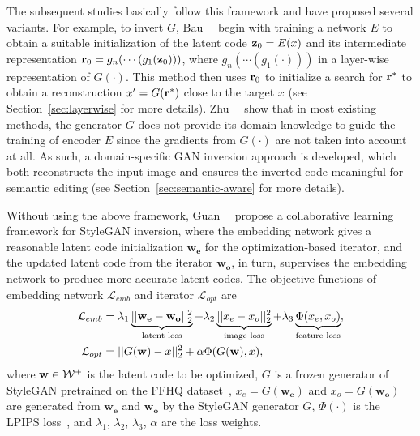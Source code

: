 The subsequent studies basically follow this framework and have proposed several variants.
For example, to invert $G$, Bau~\etal~\cite{bau2019inverting} begin with training a network $E$ to obtain a suitable initialization of the latent code $\mathbf{z}_{0}=E(x)$ and its intermediate representation $\mathbf{r}_{0}=g_{n}(\cdots(g_{1}(\mathbf{z}_{0})))$, where $g_{n}(\cdots(g_{1}(\cdot)))$ in a layer-wise representation of $G(\cdot)$.
This method then uses $\mathbf{r}_{0}$ to initialize a search for $\mathbf{r}^{*}$ to obtain a reconstruction $x^{\prime}=G(\mathbf{r}^{*})$ close to the target $x$ 
(see Section~\ref{sec:layerwise} for more details).
Zhu~\etal~\cite{zhu2020indomain} show that in most existing methods, the generator $G$ does not provide its domain knowledge to guide the training of encoder $E$ since the gradients from $G(\cdot)$ are not taken into account at all. 
As such, a domain-specific GAN inversion approach is developed, which both reconstructs the input image and ensures the inverted code meaningful for semantic editing 
(see Section~\ref{sec:semantic-aware} for more details).

Without using the above framework, Guan~\etal~\cite{guan2020faster} propose a collaborative learning framework for StyleGAN inversion, where the embedding network gives a reasonable latent code initialization $\mathbf{w_e}$ for the optimization-based iterator, and the updated latent code from the iterator $\mathbf{w_o}$, in turn, supervises the embedding network to produce more accurate latent codes. The objective functions of embedding network $\mathcal{L}_{emb}$ and iterator $\mathcal{L}_{opt}$ are 
\begin{equation}
\begin{aligned}
\mathcal{L}_{emb} & = \lambda_1 \underbrace{||\mathbf{w_e} - \mathbf{w_o}||_2^2}_{\text{latent loss}} + \lambda_2 \underbrace{||{x_e} - {x_o}||_2^2}_{\text{image loss}} + \lambda_3 \underbrace{\Phi({x_e}, {x_o})}_{\text{feature loss}}, \\
\mathcal{L}_{opt} & = ||G(\mathbf{w}) - {x}||_2^2 + \alpha \Phi(G(\mathbf{w}), x),\\
\end{aligned}
\end{equation}
where $\mathbf{w} \in \mathcal{W^+}$ is the latent code to be optimized, $G$ is a frozen generator of StyleGAN pretrained on the FFHQ dataset~\cite{karras2019style}, ${x_e} = G(\mathbf{w_e})$ and ${x_o} = G(\mathbf{w_o})$ are generated from $\mathbf{w_e}$ and $\mathbf{w_o}$ by the StyleGAN generator $G$, $\Phi(\cdot)$ is the LPIPS loss~\cite{zhang2018unreasonable}, and $\lambda_1$, $\lambda_2$, $\lambda_3$, $\alpha$ are the loss weights.




